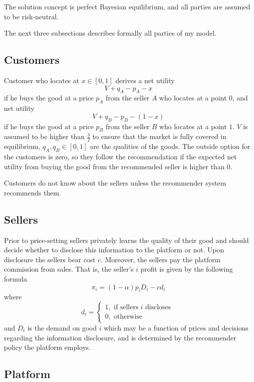\documentclass[a4paper]{article}
\begin{document}
	
	
	The solution concept is perfect Bayesian equilibrium, and all parties are assumed to be risk-neutral.
	
	
	
	The next three subsections describes formally all parties of my model.
	
	
	
	
	
	\subsection{Customers}
	Customer who locates at $x \in [0, 1]$ derives a net utility $$V + q_A - p_A - x$$ if  he buys the good at a price $p_A$ from the seller $A$ who locates at a point $0$, and net utility $$V + q_B - p_B - (1-x)$$ if  he buys the good at a price $p_B$ from the seller $B$ who locates at a point $1$. $V$ is assumed to be higher than $\frac{3}{2}$ to ensure that the market is fully covered in equilibrium, $q_A, q_B \in [0, 1]$ are the qualities of the goods. The outside option for the customers is zero, so they follow the recommendation if the expected net utility from buying the good from the recommended seller is higher than 0.
	
	
	
	Customers do not know about the sellers unless the recommender system recommends them.
	
	
	\subsection{Sellers}
	
	
	Prior to price-setting sellers privately learns the quality of their good and should decide whether to disclose this information to the platform or not. Upon disclosure the sellers bear cost $c$. Moreover, the sellers pay the platform commission from sales. That is, the seller's $i$ profit is given by the following formula
	$$\pi_i = (1-\alpha)p_i D_i - c d_i$$
	where $$d_i = \begin{cases}
	1, \text{ if sellers }i\text{ discloses }\\
	0, \text{ otherwise }
	\end{cases}$$ and $D_i$ is the demand on good $i$ which may be a function of prices and decisions regarding the information disclosure, and is determined by the recommender policy the platform employs.
	
	
	
	\subsection{Platform}
	
\end{document}
